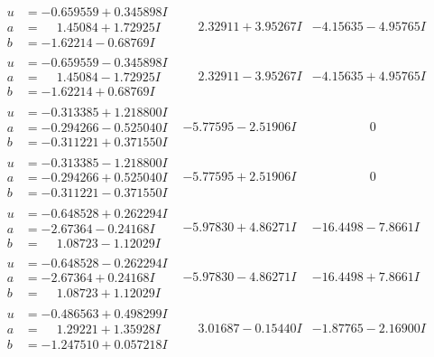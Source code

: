 \documentclass[1p]{elsarticle_modified}
\theoremstyle{definition}
\begin{document}
$$\begin{array}{c|c|c}
\begin{aligned}
u &= -0.659559 + 0.345898 I \\
a &= \phantom{-}1.45084 + 1.72925 I \\
b &= -1.62214 - 0.68769 I\end{aligned}
 & \phantom{-}2.32911 + 3.95267 I & -4.15635 - 4.95765 I \\ \hline\begin{aligned}
u &= -0.659559 - 0.345898 I \\
a &= \phantom{-}1.45084 - 1.72925 I \\
b &= -1.62214 + 0.68769 I\end{aligned}
 & \phantom{-}2.32911 - 3.95267 I & -4.15635 + 4.95765 I \\ \hline\begin{aligned}
u &= -0.313385 + 1.218800 I \\
a &= -0.294266 - 0.525040 I \\
b &= -0.311221 + 0.371550 I\end{aligned}
 & -5.77595 - 2.51906 I & \phantom{-0.000000 } 0 \\ \hline\begin{aligned}
u &= -0.313385 - 1.218800 I \\
a &= -0.294266 + 0.525040 I \\
b &= -0.311221 - 0.371550 I\end{aligned}
 & -5.77595 + 2.51906 I & \phantom{-0.000000 } 0 \\ \hline\begin{aligned}
u &= -0.648528 + 0.262294 I \\
a &= -2.67364 - 0.24168 I \\
b &= \phantom{-}1.08723 - 1.12029 I\end{aligned}
 & -5.97830 + 4.86271 I & -16.4498 - 7.8661 I \\ \hline\begin{aligned}
u &= -0.648528 - 0.262294 I \\
a &= -2.67364 + 0.24168 I \\
b &= \phantom{-}1.08723 + 1.12029 I\end{aligned}
 & -5.97830 - 4.86271 I & -16.4498 + 7.8661 I \\ \hline\begin{aligned}
u &= -0.486563 + 0.498299 I \\
a &= \phantom{-}1.29221 + 1.35928 I \\
b &= -1.247510 + 0.057218 I\end{aligned}
 & \phantom{-}3.01687 - 0.15440 I & -1.87765 - 2.16900 I \\ \hline\begin{aligned}

\end{aligned}
\end{array}$$
\end{document}
